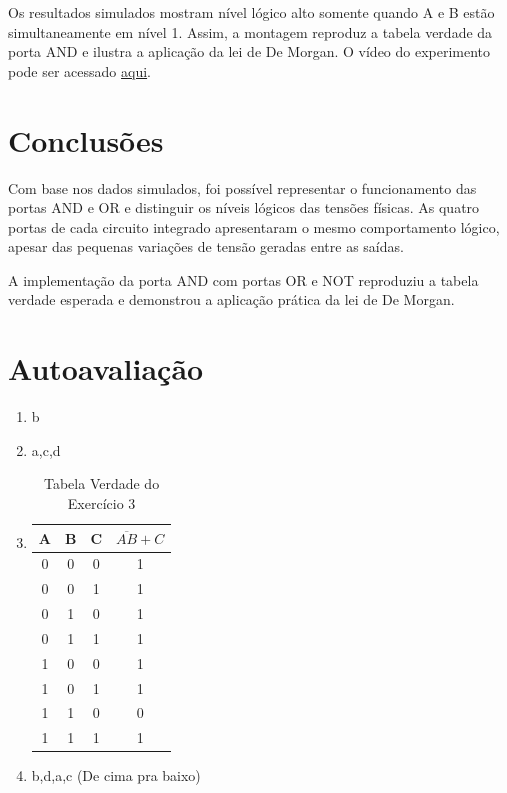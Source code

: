 \documentclass[12pt]{article}
\begin{document}
Os resultados simulados mostram nível lógico alto somente quando A e B estão
simultaneamente em nível 1. Assim, a montagem reproduz a tabela verdade da porta
AND e ilustra a aplicação da lei de De Morgan. O vídeo do experimento pode ser acessado \href{https://drive.google.com/file/d/1xrnp6LJTi8HymDi-AswCgr1Z5TA05lby/view?usp=drive_link}{aqui}.


\section{Conclusões}
\label{sec:conclusao}

Com base nos dados simulados, foi possível representar o funcionamento das
portas AND e OR e distinguir os níveis lógicos das tensões físicas. As quatro
portas de cada circuito integrado apresentaram o mesmo comportamento lógico,
apesar das pequenas variações de tensão geradas entre as saídas.

A implementação da porta AND com portas OR e NOT reproduziu a tabela verdade
esperada e demonstrou a aplicação prática da lei de De Morgan.

\newpage
\section*{Autoavaliação}

\begin{enumerate}
    \item b
    \item a,c,d
    \item \begin{table} [H]
    \centering
    \caption{Tabela Verdade do Exercício 3}
    \label{tab:tabela-autoav}
    \begin{tabular}{|c|c|c|c|}
        \hline
        A & B & C & \(\overline{AB} + C\)\\
        \hline
        0 & 0 & 0 & 1 \\
        \hline
        0 & 0 & 1 & 1 \\
        \hline
        0 & 1 & 0 & 1 \\
        \hline
        0 & 1 & 1 & 1 \\
        \hline
        1 & 0 & 0 & 1 \\
        \hline
        1 & 0 & 1 & 1 \\
        \hline
        1 & 1 & 0 & 0 \\
        \hline
        1 & 1 & 1 & 1 \\
        \hline
    \end{tabular}        
    \end{table}
    \item b,d,a,c (De cima pra baixo)
\end{enumerate}



\end{document}

